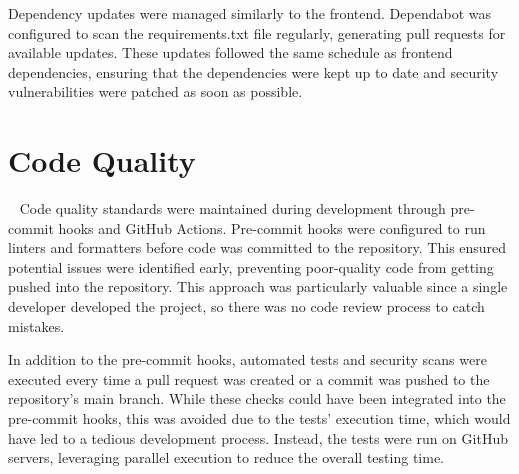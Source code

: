 Dependency updates were managed similarly to the frontend. Dependabot was configured to scan the requirements.txt file regularly, generating pull requests for available updates. These updates followed the same schedule as frontend dependencies, ensuring that the dependencies were kept up to date and security vulnerabilities were patched as soon as possible.

\section{Code Quality}~\label{sec:code-quality}
Code quality standards were maintained during development through pre-commit hooks and GitHub Actions. Pre-commit hooks were configured to run linters and formatters before code was committed to the repository. This ensured potential issues were identified early, preventing poor-quality code from getting pushed into the repository. This approach was particularly valuable since a single developer developed the project, so there was no code review process to catch mistakes.

In addition to the pre-commit hooks, automated tests and security scans were executed every time a pull request was created or a commit was pushed to the repository's main branch. While these checks could have been integrated into the pre-commit hooks, this was avoided due to the tests' execution time, which would have led to a tedious development process. Instead, the tests were run on GitHub servers, leveraging parallel execution to reduce the overall testing time.
